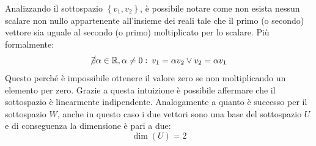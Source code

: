 \documentclass[a4paper]{article}
\begin{document}
	\noindent
	Analizzando il sottospazio $\left\{v_{1},v_{2}\right\}$, è possibile notare come non esista nessun scalare non nullo appartenente all'insieme dei reali tale che il primo (o secondo) vettore sia uguale al secondo (o primo) moltiplicato per lo scalare. Più formalmente:
	\begin{equation*}
		\cancel{\exists} \alpha \in \mathbb{R}, \alpha \ne 0: \: v_{1} = \alpha v_{2} \lor v_{2} = \alpha v_{1}
	\end{equation*}
	Questo perché è impossibile ottenere il valore zero se non moltiplicando un elemento per zero. Grazie a questa intuizione è possibile affermare che il sottospazio è linearmente indipendente. Analogamente a quanto è successo per il sottospazio $W$, anche in questo caso i due vettori sono una base del sottospazio $U$ e di conseguenza la dimensione è pari a due:
	\begin{equation*}
		\dim\left(U\right) = 2
	\end{equation*}\newline
\end{document}
